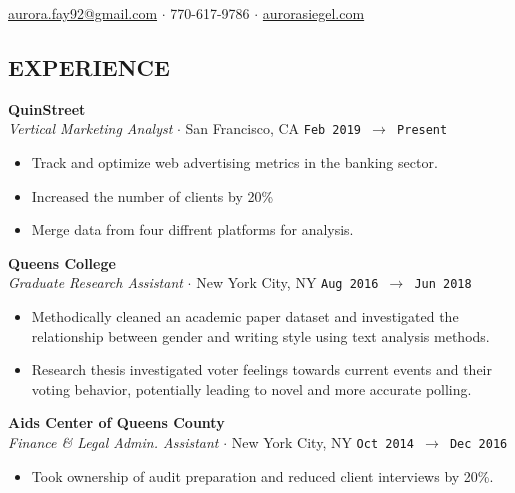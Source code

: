 \documentclass[margin, line, 11pt]{res}
\begin{document}
\noindent\hspace{-1.0in}{\LARGE\bf Aurora Siegel}
\hfill \href{mailto:aurora.fay92@gmail.com}{aurora.fay92@gmail.com}
$\cdot$ 770-617-9786
$\cdot$ \href{http://aurorasiegel.com}{aurorasiegel.com}

\begin{resume}

\section{EXPERIENCE}

{\bf QuinStreet}\vspace{0.04in}
\\ {\it Vertical Marketing Analyst} $\cdot$ San Francisco, CA \hfill\texttt{Feb 2019 $\to$ Present}\vspace{0.04in}
\begin{itemize}
\item Track and optimize web advertising metrics in the banking sector.
\item Increased the number of clients by 20\%
\item Merge data from four diffrent platforms for analysis.
\end{itemize}

{\bf Queens College}\vspace{0.04in}
\\ {\it Graduate Research Assistant} $\cdot$ New York City, NY \hfill\texttt{Aug 2016 $\to$ Jun 2018}\vspace{0.04in}
\begin{itemize}
\item Methodically cleaned an academic paper dataset and investigated the relationship between gender and writing style using text analysis methods. 
\item Research thesis investigated voter feelings towards current events and their voting behavior, potentially leading to novel and more accurate polling.
\end{itemize}

{\bf Aids Center of Queens County}\vspace{0.04in}
\\ {\it Finance \& Legal Admin. Assistant} $\cdot$ New York City, NY \hfill\texttt{Oct 2014 $\to$ Dec 2016}\vspace{0.04in}
\begin{itemize}
\item Took ownership of audit preparation and reduced client interviews by 20\%.
\end{itemize}


\end{resume}
\end{document}
